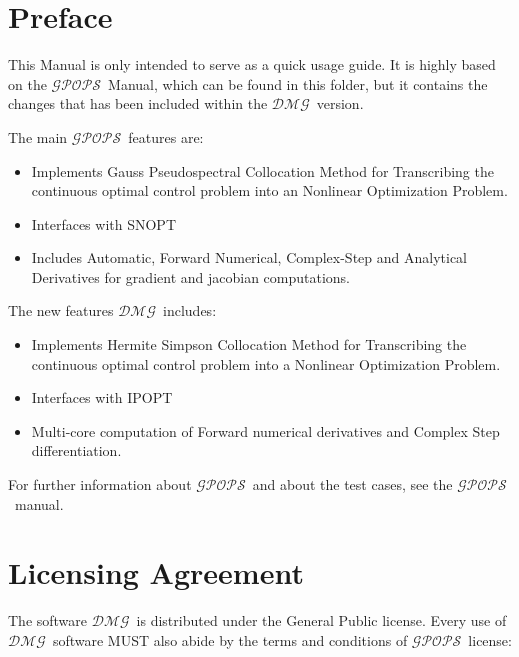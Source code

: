 \documentclass[10pt,final]{report}
\newcommand{\dmg}{$\mathcal{DMG}$~}
\newcommand{\gpops}{$\mathcal{GPOPS}$~}
\begin{document}
\chapter*{Preface }

This Manual is only intended to serve as a quick usage guide. It is highly based on the \gpops Manual, which can be found in this folder, but it contains the changes that has been included within the \dmg version.

The main \gpops features are:
\begin{itemize}
\item Implements Gauss Pseudospectral Collocation Method for Transcribing the continuous optimal control problem into an Nonlinear Optimization Problem.
\item Interfaces with SNOPT
\item Includes Automatic, Forward Numerical, Complex-Step and Analytical Derivatives for gradient and jacobian computations.
\end{itemize}
The new features \dmg includes:
\begin{itemize}
\item Implements Hermite Simpson Collocation Method for Transcribing the continuous optimal control problem into a Nonlinear Optimization Problem.
\item Interfaces with IPOPT
\item Multi-core computation of Forward numerical derivatives and Complex Step differentiation.
\end{itemize}

For further information about \gpops and about the test cases, see the \gpops manual.



\chapter*{Licensing Agreement}

The software \dmg is distributed under the General Public license. Every use of \dmg software MUST also abide by the terms and conditions of \gpops license:
\end{document}
